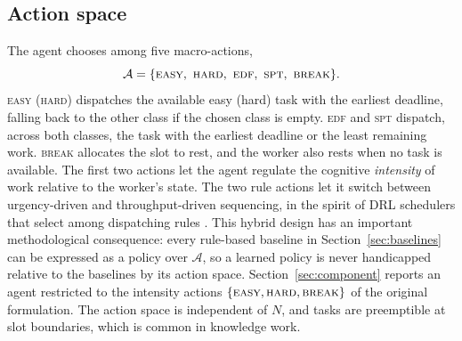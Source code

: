 \subsection{Action space}\label{sec:actions}
The agent chooses among five macro-actions,
\begin{equation}
\mathcal A=\{\textsc{easy},\ \textsc{hard},\ \textsc{edf},\ \textsc{spt},\ \textsc{break}\}.
\label{eq:actions}
\end{equation}
\textsc{easy} (\textsc{hard}) dispatches the available easy (hard) task with the earliest deadline, falling back to the other class if the chosen class is empty. \textsc{edf} and \textsc{spt} dispatch, across both classes, the task with the earliest deadline or the least remaining work. \textsc{break} allocates the slot to rest, and the worker also rests when no task is available. The first two actions let the agent regulate the cognitive \emph{intensity} of work relative to the worker's state. The two rule actions let it switch between urgency-driven and throughput-driven sequencing, in the spirit of DRL schedulers that select among dispatching rules \cite{luo2020,panzer2022}. This hybrid design has an important methodological consequence: every rule-based baseline in Section~\ref{sec:baselines} can be expressed as a policy over $\mathcal A$, so a learned policy is never handicapped relative to the baselines by its action space. Section~\ref{sec:component} reports an agent restricted to the intensity actions $\{\textsc{easy},\textsc{hard},\textsc{break}\}$ of the original formulation. The action space is independent of $N$, and tasks are preemptible at slot boundaries, which is common in knowledge work.

